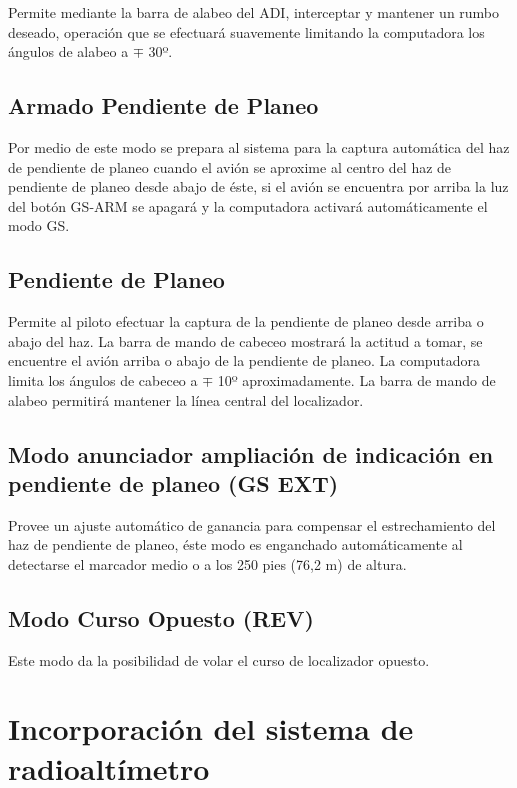 \documentclass[a4paper,12pt,twoside]{article}
\begin{document}
Permite mediante la barra de alabeo del ADI, interceptar y mantener
un rumbo deseado, operaci\'on que se efectuar\'a suavemente
limitando la computadora los \'angulos de alabeo a $\mp$ 30º.

\subsection{Armado Pendiente de Planeo}
\label{sec:GS.arm}

Por medio de este modo se prepara al sistema para la captura
autom\'atica del haz de pendiente de planeo 
cuando el avi\'on se aproxime al centro del haz de pendiente
de planeo desde abajo de \'este, si el avi\'on se encuentra
por arriba la luz del bot\'on GS-ARM se apagar\'a y la
computadora activar\'a autom\'aticamente el modo GS.

\subsection{Pendiente de Planeo}
\label{sec:gs}

Permite al piloto efectuar la captura de la pendiente de planeo
desde arriba o abajo del haz. La barra de mando de cabeceo mostrar\'a
la actitud a tomar, se encuentre el avi\'on arriba o abajo de la pendiente
de planeo.
La computadora limita los \'angulos de cabeceo a $\mp$ 10º aproximadamente.
La barra de mando de alabeo permitir\'a mantener la l\'inea central del
localizador.

\subsection{Modo anunciador ampliaci\'on de indicaci\'on en pendiente de planeo (GS EXT)}
\label{sec:gs.ext}

Provee un ajuste autom\'atico de ganancia para compensar el estrechamiento
del haz de pendiente de planeo, \'este modo es enganchado
autom\'aticamente al detectarse el marcador medio o a los 250 pies (76,2 m)
de altura.

\subsection{Modo Curso Opuesto (REV)}
\label{sec:rev}

Este modo da la posibilidad de volar el curso de localizador opuesto.

\section{Incorporaci\'on del sistema de radioalt\'imetro}
\label{sec:incorporacion.sistema.radio.altimetro}
\end{document}
